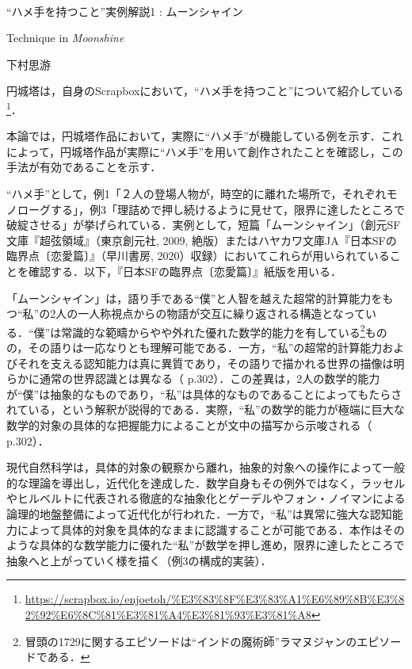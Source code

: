 \documentclass[10pt, a5paper, twoside]{jsarticle}
\theoremstyle{definition}
\begin{document}
	~ %

	\begin{center}

		\Large{“ハメ手を持つこと”実例解説1 : ムーンシャイン}

		\vspace{3mm}

		\large{Technique in \textit{Moonshine}}

		\vspace{3mm}
		
		\large{下村思游}

	\end{center}

	\vspace{3mm}

		円城塔は，自身のScrapboxにおいて，“ハメ手を持つこと”について紹介している\footnote{\url{https://scrapbox.io/enjoetoh/%E3%83%8F%E3%83%A1%E6%89%8B%E3%82%92%E6%8C%81%E3%81%A4%E3%81%93%E3%81%A8}}．

		本論では，円城塔作品において，実際に“ハメ手”が機能している例を示す．これによって，円城塔作品が実際に“ハメ手”を用いて創作されたことを確認し，この手法が有効であることを示す．

		“ハメ手”として，例1「２人の登場人物が，時空的に離れた場所で，それぞれモノローグする」，例3「理詰めで押し続けるように見せて，限界に達したところで破綻させる」が挙げられている．実例として，短篇「ムーンシャイン」（創元SF文庫『超弦領域』（東京創元社, 2009, 絶版）またはハヤカワ文庫JA『日本SFの臨界点〔恋愛篇〕』（早川書房, 2020）収録）においてこれらが用いられていることを確認する．以下，『日本SFの臨界点〔恋愛篇〕』紙版を用いる．

		「ムーンシャイン」は，語り手である“僕”と人智を越えた超常的計算能力をもつ“私”の2人の一人称視点からの物語が交互に繰り返される構造となっている．“僕”は常識的な範疇からやや外れた優れた数学的能力を有している\footnote{冒頭の1729に関するエピソードは“インドの魔術師”ラマヌジャンのエピソードである．}ものの，その語りは一応なりとも理解可能である．一方，“私”の超常的計算能力およびそれを支える認知能力は真に異質であり，その語りで描かれる世界の描像は明らかに通常の世界認識とは異なる（\cite{moon} p.302）．この差異は，2人の数学的能力が“僕”は抽象的なものであり，“私”は具体的なものであることによってもたらされている，という解釈が説得的である．実際，“私”の数学的能力が極端に巨大な数学的対象の具体的な把握能力によることが文中の描写から示唆される（\cite{moon} p.302）．

		現代自然科学は，具体的対象の観察から離れ，抽象的対象への操作によって一般的な理論を導出し，近代化を達成した．数学自身もその例外ではなく，ラッセルやヒルベルトに代表される徹底的な抽象化とゲーデルやフォン・ノイマンによる論理的地盤整備によって近代化が行われた．一方で，“私”は異常に強大な認知能力によって具体的対象を具体的なままに認識することが可能である．本作はそのような具体的な数学能力に優れた“私”が数学を押し進め，限界に達したところで抽象へと上がっていく様を描く（例3の構成的実装）．
\end{document}

